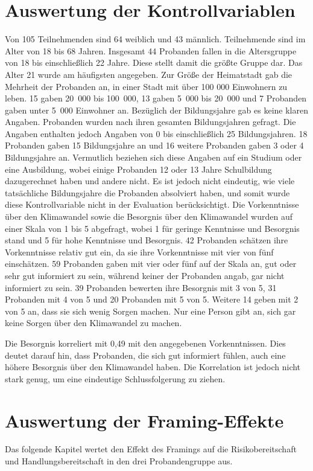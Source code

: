 \documentclass[
	12pt, %
	a4paper,
	listof=totoc, %
  bibliography=totoc, %
	numbers=noenddot, %
	german, %
	headsepline, %
	oneside %
	]{scrbook} %
\begin{document}
\section{Auswertung der Kontrollvariablen}
Von 105 Teilnehmenden sind 64 weiblich und 43 männlich.
Teilnehmende sind im Alter von 18 bis 68 Jahren. Insgesamt 44 Probanden fallen in die Altersgruppe von 18 bis einschließlich 22 Jahre. Diese stellt damit die größte Gruppe dar. Das Alter 21 wurde am häufigsten angegeben. 
Zur Größe der Heimatstadt gab die Mehrheit der Probanden an, in einer Stadt mit über 100 000 Einwohnern zu leben. 15 gaben 20 000 bis 100 000, 13 gaben 5 000 bis 20 000 und 7 Probanden gaben unter 5 000 Einwohner an.
Bezüglich der Bildungsjahre gab es keine klaren Angaben. Probanden wurden nach ihren gesamten Bildungsjahren gefragt. Die Angaben enthalten jedoch Angaben von 0 bis einschließlich 25 Bildungsjahren. 18 Probanden gaben 15 Bildungsjahre an und 16 weitere Probanden gaben 3 oder 4 Bildungsjahre an. Vermutlich beziehen sich diese Angaben auf ein Studium oder eine Ausbildung, wobei einige Probanden 12 oder 13 Jahre Schulbildung dazugerechnet haben und andere nicht. Es ist jedoch nicht eindeutig, wie viele tatsächliche Bildungsjahre die Probanden absolviert haben, und somit wurde diese Kontrollvariable nicht in der Evaluation berücksichtigt.
Die Vorkenntnisse über den Klimawandel sowie die Besorgnis über den Klimawandel wurden auf einer Skala von 1 bis 5 abgefragt, wobei 1 für geringe Kenntnisse und Besorgnis stand und 5 für hohe Kenntnisse und Besorgnis.
42 Probanden schätzen ihre Vorkenntnisse relativ gut ein, da sie ihre Vorkenntnisse mit vier von fünf einschätzen. 59 Probanden gaben mit vier oder fünf auf der Skala an, gut oder sehr gut informiert zu sein, während keiner der Probanden angab, gar nicht informiert zu sein.
39 Probanden bewerten ihre Besorgnis mit 3 von 5, 31 Probanden mit 4 von 5 und 20 Probanden mit 5 von 5.
Weitere 14 geben mit 2 von 5 an, dass sie sich wenig Sorgen machen. Nur eine Person gibt an, sich gar keine Sorgen über den Klimawandel zu machen.

Die Besorgnis korreliert mit 0,49 mit den angegebenen Vorkenntnissen. Dies deutet darauf hin, dass Probanden, die sich gut informiert fühlen, auch eine höhere Besorgnis über den Klimawandel haben. Die Korrelation ist jedoch nicht stark genug, um eine eindeutige Schlussfolgerung zu ziehen.

\section{Auswertung der Framing-Effekte}
Das folgende Kapitel wertet den Effekt des Framings auf die Risikobereitschaft und Handlungsbereitschaft in den drei Probandengruppe aus.
\end{document}
